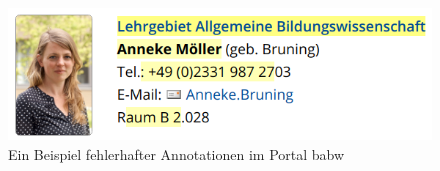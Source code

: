     \begin{figure}[htb]
        \centering
        \includegraphics[scale=\screenshotScaleFactor]{../resources/findings/case-study-1/babw/annotations/missing-annotation.png}
        \caption{Ein Beispiel fehlerhafter Annotationen im Portal \acrshort{babw}}
        \label{image:findingTeachersBaBwWrongAnnotations}
    \end{figure}
